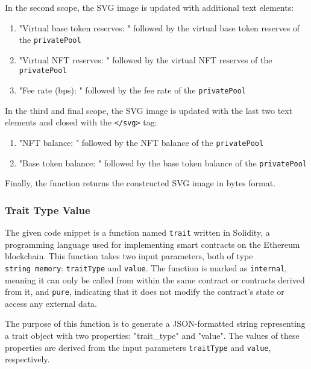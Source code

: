 In the second scope, the SVG image is updated with additional text
elements:

\begin{enumerate}
\def\labelenumi{\arabic{enumi}.}
\setcounter{enumi}{4}
\tightlist
\item
  "Virtual base token reserves: " followed by the virtual base token
  reserves of the \texttt{privatePool}
\item
  "Virtual NFT reserves: " followed by the virtual NFT reserves of the
  \texttt{privatePool}
\item
  "Fee rate (bps): " followed by the fee rate of the
  \texttt{privatePool}
\end{enumerate}

In the third and final scope, the SVG image is updated with the last two
text elements and closed with the \texttt{\textless{}/svg\textgreater{}}
tag:

\begin{enumerate}
\def\labelenumi{\arabic{enumi}.}
\setcounter{enumi}{7}
\tightlist
\item
  "NFT balance: " followed by the NFT balance of the
  \texttt{privatePool}
\item
  "Base token balance: " followed by the base token balance of the
  \texttt{privatePool}
\end{enumerate}

Finally, the function returns the constructed SVG image in bytes format.

\hypertarget{trait-type-value}{%
\subsubsection{Trait Type Value}\label{trait-type-value}}

The given code snippet is a function named \texttt{trait} written in
Solidity, a programming language used for implementing smart contracts
on the Ethereum blockchain. This function takes two input parameters,
both of type \texttt{string\ memory}: \texttt{traitType} and
\texttt{value}. The function is marked as \texttt{internal}, meaning it
can only be called from within the same contract or contracts derived
from it, and \texttt{pure}, indicating that it does not modify the
contract's state or access any external data.

The purpose of this function is to generate a JSON-formatted string
representing a trait object with two properties: "trait\_type" and
"value". The values of these properties are derived from the input
parameters \texttt{traitType} and \texttt{value}, respectively.

